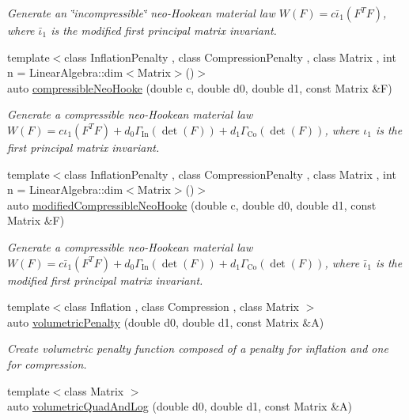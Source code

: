 \begin{DoxyCompactItemize}
\begin{DoxyCompactList}\small\item\em Generate an \char`\"{}incompressible\char`\"{} neo-\/\+Hookean material law $ W(F)=c\bar\iota_1(F^T F) $, where $\bar\iota_1$ is the modified first principal matrix invariant. \end{DoxyCompactList}\item 
{\footnotesize template$<$class Inflation\+Penalty , class Compression\+Penalty , class Matrix , int n = Linear\+Algebra\+::dim$<$\+Matrix$>$()$>$ }\\auto \hyperlink{group__Rubber_gac5c39cd9de55f4f0220a806cf28a7b30}{compressible\+Neo\+Hooke} (double c, double d0, double d1, const Matrix \&F)
\begin{DoxyCompactList}\small\item\em Generate a compressible neo-\/\+Hookean material law $ W(F)=c\iota_1(F^T F)+d_0\Gamma_\mathrm{In}(\det(F))+d_1\Gamma_\mathrm{Co}(\det(F)) $, where $\iota_1$ is the first principal matrix invariant. \end{DoxyCompactList}\item 
{\footnotesize template$<$class Inflation\+Penalty , class Compression\+Penalty , class Matrix , int n = Linear\+Algebra\+::dim$<$\+Matrix$>$()$>$ }\\auto \hyperlink{group__Rubber_gac10942df03f037afdf0a81d330361a6b}{modified\+Compressible\+Neo\+Hooke} (double c, double d0, double d1, const Matrix \&F)
\begin{DoxyCompactList}\small\item\em Generate a compressible neo-\/\+Hookean material law $ W(F)=c\bar\iota_1(F^T F)+d_0\Gamma_\mathrm{In}(\det(F))+d_1\Gamma_\mathrm{Co}(\det(F)) $, where $\bar\iota_1$ is the modified first principal matrix invariant. \end{DoxyCompactList}\item 
{\footnotesize template$<$class Inflation , class Compression , class Matrix $>$ }\\auto \hyperlink{namespaceFunG_ad26faeb264bb4b1cd7e70f3811c366c8}{volumetric\+Penalty} (double d0, double d1, const Matrix \&A)
\begin{DoxyCompactList}\small\item\em Create volumetric penalty function composed of a penalty for inflation and one for compression. \end{DoxyCompactList}\item 
{\footnotesize template$<$class Matrix $>$ }\\auto \hyperlink{namespaceFunG_aaf30b9c36ed86e01b94f6b7c1d95cae8}{volumetric\+Quad\+And\+Log} (double d0, double d1, const Matrix \&A)

\end{DoxyCompactItemize}
